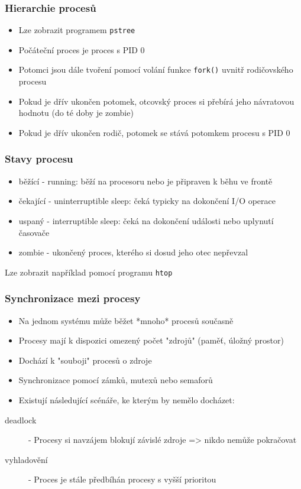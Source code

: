 \documentclass[professionalfonts,svgnames]{beamer}
\begin{document}
\begin{frame}
\frametitle{Hierarchie procesů}
\begin{itemize} %
	\item Lze zobrazit programem \texttt{pstree}
	\item Počáteční proces je proces s PID 0
	\item Potomci jsou dále tvoření pomocí volání funkce \texttt{fork()} uvnitř rodičovského procesu
	\item Pokud je dřív ukončen potomek, otcovský proces si přebírá jeho návratovou hodnotu (do té doby je zombie)
	\item Pokud je dřív ukončen rodič, potomek se stává potomkem procesu s PID 0
\end{itemize}
\end{frame}


\begin{frame}
\frametitle{Stavy procesu}
\begin{itemize} %
		\item běžící - running: běží na procesoru nebo je připraven k běhu ve frontě
		\item čekající - uninterruptible sleep: čeká typicky na dokončení I/O operace
		\item uspaný - interruptible sleep: čeká na dokončení události nebo uplynutí časovače
		\item zombie - ukončený proces, kterého si dosud jeho otec nepřevzal
\end{itemize}
Lze zobrazit například pomocí programu \texttt{htop}
\end{frame}


\begin{frame}
\frametitle{Synchronizace mezi procesy}
\begin{itemize} %
	\item Na jednom systému může běžet *mnoho* procesů současně
	\item Procesy mají k dispozici omezený počet "zdrojů" (paměť, úložný prostor)
	\item Dochází k "souboji" procesů o zdroje
	\item Synchronizace pomocí zámků, mutexů nebo semaforů
	\item Existují následující scénáře, ke kterým by nemělo docházet:
\end{itemize}
\begin{description}
	\item [deadlock] - Procesy si navzájem blokují závislé zdroje => nikdo nemůže pokračovat
	\item [vyhladovění] - Proces je stále předbíhán procesy s vyšší prioritou
\end{description}
\end{frame}
\end{document}
